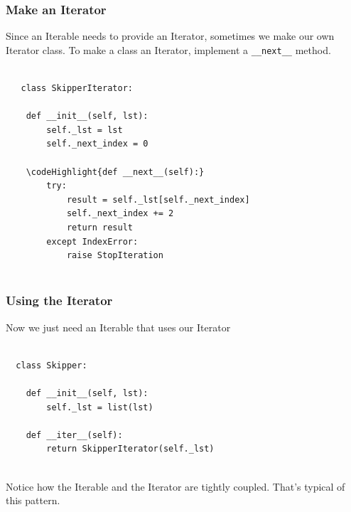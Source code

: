 \documentclass[10pt]{beamer}
\newcommand\codeHighlight[1]{\textcolor[rgb]{1,0,0}{\textbf{#1}}}
\begin{document}
\begin{frame}[fragile]
  \frametitle{Make an Iterator}
  Since an Iterable needs to provide an Iterator, sometimes
  we make our own Iterator class. To make a class an Iterator,
  implement a \texttt{\_\_next\_\_} method.
  
  \begin{Verbatim}[commandchars=\\\{\}]
        
   class SkipperIterator:
  
    def __init__(self, lst):
        self._lst = lst
        self._next_index = 0
        
    \codeHighlight{def __next__(self):}
        try:
            result = self._lst[self._next_index]
            self._next_index += 2
            return result
        except IndexError:
            raise StopIteration       
           
  \end{Verbatim}
       
\end{frame} 

\begin{frame}[fragile]
  \frametitle{Using the Iterator}
  
  Now we just need an Iterable that uses our Iterator
    
  \begin{Verbatim}[commandchars=\\\{\}]
  
  class Skipper:  
  
    def __init__(self, lst):
        self._lst = list(lst)
        
    def __iter__(self):
        return SkipperIterator(self._lst)
        
    \end{Verbatim}
  Notice how the Iterable and the Iterator are tightly coupled. That's typical 
  of this pattern.     
\end{frame} 
\end{document}

